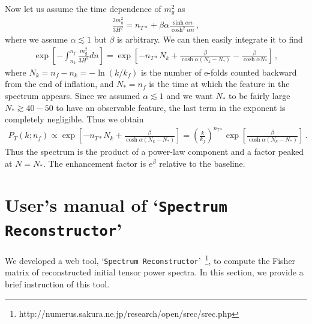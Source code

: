 \documentclass[tightenlines,floats,aps,nofootinbib,prd,onecolumn,preprintnumbers]{revtex4}
\newcommand{\appname}{`{\tt Spectrum Reconstructor}'~}
\begin{document}
Now let us assume the time dependence of $m_g^2$ as
%
\begin{align}
\frac{2m_g^2}{3H^2}=n_{T*}+\beta\alpha\frac{\sinh\alpha n}{\cosh^2\alpha n}\,,
\end{align}
%
where we assume $\alpha\lesssim 1$ but $\beta$ is arbitrary.
We can then easily integrate it to find
%
\begin{align}
\exp\left[-\int_{n_k}^{n_f}\frac{m_g^2}{3H^2}dn\right]
=\exp\left[-n_{T*}N_k+\frac{\beta}{\cosh\alpha(N_k-N_*)}
-\frac{\beta}{\cosh\alpha N_*}\right]\,,
\end{align}
%
where $N_k=n_f-n_k=-\ln(k/k_f)$ is the number of e-folds counted backward
from the end of inflation, and $N_*=n_f$ is the time at which
the feature in the spectrum appears. Since we assumed $\alpha\lesssim1$
and we want $N_*$ to be fairly large $N_*\gtrsim 40-50$ to have an 
observable feature,
 the last term in the exponent is completely negligible.
Thus we obtain
%
\begin{align}
P_T(k;n_f)\propto
\exp\left[-n_{T*}N_k+\frac{\beta}{\cosh\alpha(N_k-N_*)}\right]
=\left(\frac{k}{k_f}\right)^{n_{T*}}
\exp\left[\frac{\beta}{\cosh\alpha(N_k-N_*)}\right]\,.
\end{align}
%
Thus the spectrum is the product of a power-law component
and a factor peaked at $N=N_*$. The enhancement factor is
$e^\beta$ relative to the baseline.

\section{User's manual of \appname}
\label{appsub:users} 
We developed a web tool,
\appname\footnote{http://numerus.sakura.ne.jp/research/open/srec/srec.php}, to
compute the Fisher matrix of reconstructed initial tensor power
spectra. In this section, we provide a brief instruction of this tool.
\end{document}
